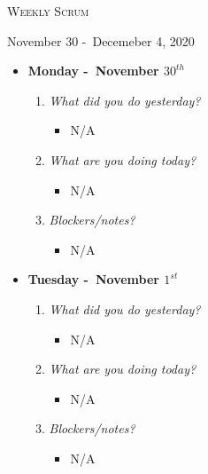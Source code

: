 \centerline{\LARGE\textsc{Weekly Scrum}}
\centerline{November 30 -\ Decemeber 4, 2020}
\textbf{}
\begin{itemize}
  \item[] \textbf{\large Monday -\ November \(30^{th}\)}
  \begin{enumerate}
    \item \textsl{What did you do yesterday?}
    \begin{itemize}
      \item N/A
    \end{itemize}
    \item \textsl{What are you doing today?}
    \begin{itemize}
      \item N/A
    \end{itemize}
    \item \textsl{Blockers/notes?}
    \begin{itemize}
      \item N/A
    \end{itemize}
  \end{enumerate}
\end{itemize}
\textbf{}
\begin{itemize}
  \item[] \textbf{\large Tuesday -\ November \(1^{st}\)}
  \begin{enumerate}
    \item \textsl{What did you do yesterday?}
    \begin{itemize}
      \item N/A
    \end{itemize}
    \item \textsl{What are you doing today?}
    \begin{itemize}
      \item N/A
    \end{itemize}
    \item \textsl{Blockers/notes?}
    \begin{itemize}
      \item N/A
    \end{itemize}
  \end{enumerate}
\end{itemize}
\textbf{}
